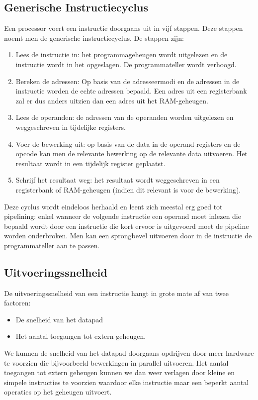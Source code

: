 \subsection{Generische Instructiecyclus}
Een processor voert een instructie doorgaans uit in vijf stappen. Deze stappen noemt men de generische instructiecyclus. De stappen zijn:
\begin{enumerate}
 \item Lees de instructie in: het programmageheugen wordt uitgelezen en de instructie wordt in het  opgeslagen. De programmateller wordt verhoogd.
 \item Bereken de adressen: Op basis van de adresseermodi en de adressen in de instructie worden de echte adressen bepaald. Een adres uit een registerbank zal er dus anders uitzien dan een adres uit het RAM-geheugen.
 \item Lees de operanden: de adressen van de operanden worden uitgelezen en weggeschreven in tijdelijke registers.
 \item Voer de bewerking uit: op basis van de data in de operand-registers en de opcode kan men de relevante bewerking op de relevante data uitvoeren. Het resultaat wordt in een tijdelijk register geplaatst.
 \item Schrijf het resultaat weg: het resultaat wordt weggeschreven in een registerbank of RAM-geheugen (indien dit relevant is voor de bewerking).
\end{enumerate}
Deze cyclus wordt eindeloos herhaald en leent zich meestal erg goed tot pipelining: enkel wanneer de volgende instructie een operand moet inlezen die bepaald wordt door een instructie die kort ervoor is uitgevoerd moet de pipeline worden onderbroken. Men kan een sprongbevel uitvoeren door in de instructie de programmateller aan te passen.
\subsection{Uitvoeringssnelheid}
De uitvoeringssnelheid van een instructie hangt in grote mate af van twee factoren:
\begin{itemize}
 \item De snelheid van het datapad
 \item Het aantal toegangen tot extern geheugen.
\end{itemize}
We kunnen de snelheid van het datapad doorgaans opdrijven door meer hardware te voorzien die bijvoorbeeld bewerkingen in parallel uitvoeren. Het aantal toegangen tot extern geheugen kunnen we dan weer verlagen door kleine en simpele instructies te voorzien waardoor elke instructie maar een beperkt aantal operaties op het geheugen uitvoert.
